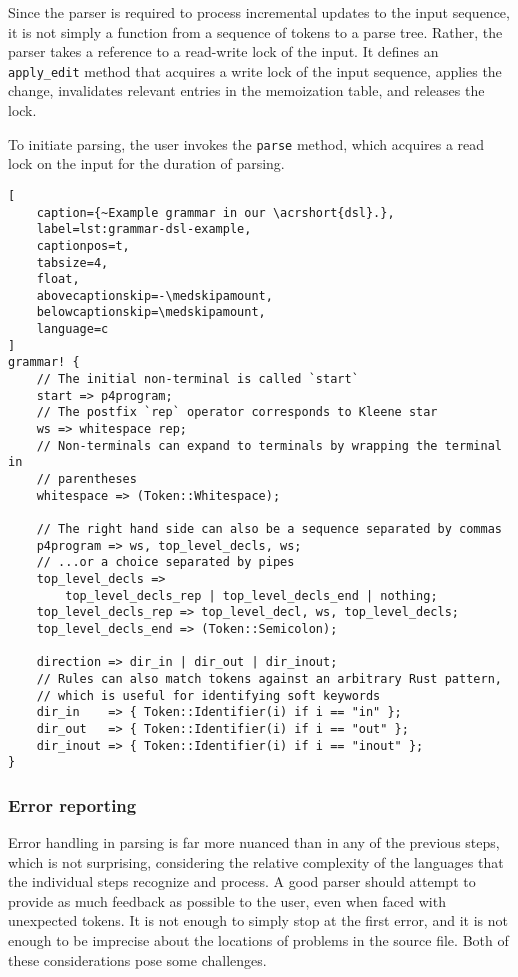 Since the parser is required to process incremental updates to the input
sequence, it is not simply a function from a sequence of tokens to a parse tree.
Rather, the parser takes a reference to a read-write lock of the input. It
defines an \texttt{apply\_edit} method that acquires a write lock of the input
sequence, applies the change, invalidates relevant entries in the memoization
table, and releases the lock.

To initiate parsing, the user invokes the \texttt{parse} method, which acquires
a read lock on the input for the duration of parsing.


\begin{lstlisting}[
	caption={~Example grammar in our \acrshort{dsl}.},
	label=lst:grammar-dsl-example,
	captionpos=t,
	tabsize=4,
	float,
	abovecaptionskip=-\medskipamount,
	belowcaptionskip=\medskipamount,
	language=c
]
grammar! {
	// The initial non-terminal is called `start`
	start => p4program;
	// The postfix `rep` operator corresponds to Kleene star
	ws => whitespace rep;
	// Non-terminals can expand to terminals by wrapping the terminal in
	// parentheses
	whitespace => (Token::Whitespace);

	// The right hand side can also be a sequence separated by commas
	p4program => ws, top_level_decls, ws;
	// ...or a choice separated by pipes
	top_level_decls =>
		top_level_decls_rep | top_level_decls_end | nothing;
	top_level_decls_rep => top_level_decl, ws, top_level_decls;
	top_level_decls_end => (Token::Semicolon);

	direction => dir_in | dir_out | dir_inout;
	// Rules can also match tokens against an arbitrary Rust pattern,
	// which is useful for identifying soft keywords
	dir_in    => { Token::Identifier(i) if i == "in" };
	dir_out   => { Token::Identifier(i) if i == "out" };
	dir_inout => { Token::Identifier(i) if i == "inout" };
}
\end{lstlisting}


\subsubsection*{Error reporting}

Error handling in parsing is far more nuanced than in any of the previous steps,
which is not surprising, considering the relative complexity of the languages
that the individual steps recognize and process. A good parser should attempt to
provide as much feedback as possible to the user, even when faced with
unexpected tokens. It is not enough to simply stop at the first error, and it is
not enough to be imprecise about the locations of problems in the source file.
Both of these considerations pose some challenges.

